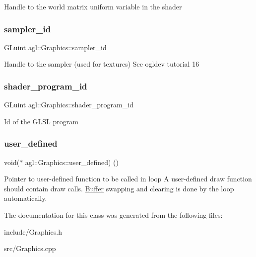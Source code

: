 Handle to the world matrix uniform variable in the shader \mbox{\label{classagl_1_1Graphics_a82ac17a72cd256e354f0587e1107b6ce}} 
\subsubsection{\texorpdfstring{sampler\_id}{sampler\_id}}
{\footnotesize\ttfamily G\+Luint agl\+::\+Graphics\+::sampler\+\_\+id\hspace{0.3cm}{\ttfamily [private]}}

Handle to the sampler (used for textures) See ogldev tutorial 16 \mbox{\label{classagl_1_1Graphics_a26482480b230df75339ee3c4d590aae5}} 
\subsubsection{\texorpdfstring{shader\_program\_id}{shader\_program\_id}}
{\footnotesize\ttfamily G\+Luint agl\+::\+Graphics\+::shader\+\_\+program\+\_\+id\hspace{0.3cm}{\ttfamily [private]}}

Id of the G\+L\+SL program \mbox{\label{classagl_1_1Graphics_aaf660bd9fd1b06652b05f7a7ef3e6fcb}} 
\subsubsection{\texorpdfstring{user\_defined}{user\_defined}}
{\footnotesize\ttfamily void($\ast$ agl\+::\+Graphics\+::user\+\_\+defined) ()\hspace{0.3cm}{\ttfamily [private]}}

Pointer to user-\/defined function to be called in loop A user-\/defined draw function should contain draw calls. \mbox{\hyperlink{classagl_1_1Buffer}{Buffer}} swapping and clearing is done by the loop automatically. 

The documentation for this class was generated from the following files\+:\begin{DoxyCompactItemize}
\item 
include/Graphics.\+h\item 
src/Graphics.\+cpp\end{DoxyCompactItemize}
